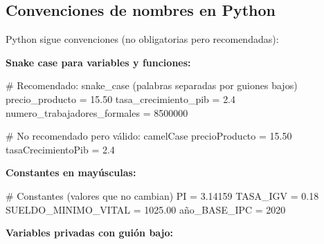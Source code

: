 \documentclass[
  doc,
  floatsintext,
  longtable,
  a4paper,
  nolmodern,
  notxfonts,
  notimes,
  12pt,
  colorlinks=true,linkcolor=blue,citecolor=blue,urlcolor=blue]{apa7}
\newenvironment{Shaded}{\begin{snugshade}}{\end{snugshade}}
\newcommand{\CommentTok}[1]{\textcolor[rgb]{0.37,0.37,0.37}{#1}}
\newcommand{\DecValTok}[1]{\textcolor[rgb]{0.68,0.00,0.00}{#1}}
\newcommand{\FloatTok}[1]{\textcolor[rgb]{0.68,0.00,0.00}{#1}}
\newcommand{\NormalTok}[1]{\textcolor[rgb]{0.00,0.23,0.31}{#1}}
\newcommand{\OperatorTok}[1]{\textcolor[rgb]{0.37,0.37,0.37}{#1}}
\begin{document}
\subsection{Convenciones de nombres en
Python}\label{convenciones-de-nombres-en-python}

Python sigue convenciones (no obligatorias pero recomendadas):

\textbf{Snake case para variables y funciones:}

\begin{Shaded}
\begin{Highlighting}[]
\CommentTok{\# Recomendado: snake\_case (palabras separadas por guiones bajos)}
\NormalTok{precio\_producto }\OperatorTok{=} \FloatTok{15.50}
\NormalTok{tasa\_crecimiento\_pib }\OperatorTok{=} \FloatTok{2.4}
\NormalTok{numero\_trabajadores\_formales }\OperatorTok{=} \DecValTok{8500000}

\CommentTok{\# No recomendado pero válido: camelCase}
\NormalTok{precioProducto }\OperatorTok{=} \FloatTok{15.50}
\NormalTok{tasaCrecimientoPib }\OperatorTok{=} \FloatTok{2.4}
\end{Highlighting}
\end{Shaded}

\textbf{Constantes en mayúsculas:}

\begin{Shaded}
\begin{Highlighting}[]
\CommentTok{\# Constantes (valores que no cambian)}
\NormalTok{PI }\OperatorTok{=} \FloatTok{3.14159}
\NormalTok{TASA\_IGV }\OperatorTok{=} \FloatTok{0.18}
\NormalTok{SUELDO\_MINIMO\_VITAL }\OperatorTok{=} \FloatTok{1025.00}
\NormalTok{año\_BASE\_IPC }\OperatorTok{=} \DecValTok{2020}
\end{Highlighting}
\end{Shaded}

\textbf{Variables privadas con guión bajo:}
\end{document}
